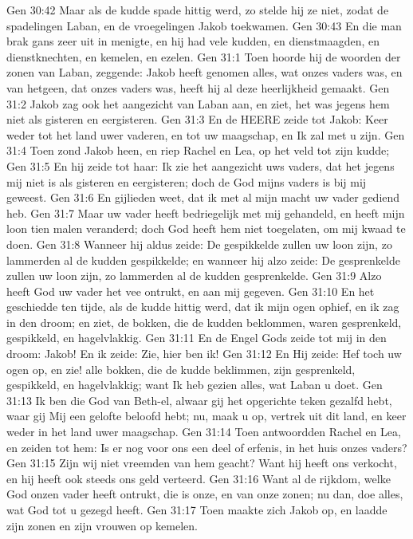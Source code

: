 Gen 30:42  Maar als de kudde spade hittig werd, zo stelde hij ze niet, zodat de spadelingen Laban, en de vroegelingen Jakob toekwamen.
Gen 30:43  En die man brak gans zeer uit in menigte, en hij had vele kudden, en dienstmaagden, en dienstknechten, en kemelen, en ezelen.
Gen 31:1  Toen hoorde hij de woorden der zonen van Laban, zeggende: Jakob heeft genomen alles, wat onzes vaders was, en van hetgeen, dat onzes vaders was, heeft hij al deze heerlijkheid gemaakt.
Gen 31:2  Jakob zag ook het aangezicht van Laban aan, en ziet, het was jegens hem niet als gisteren en eergisteren.
Gen 31:3  En de HEERE zeide tot Jakob: Keer weder tot het land uwer vaderen, en tot uw maagschap, en Ik zal met u zijn.
Gen 31:4  Toen zond Jakob heen, en riep Rachel en Lea, op het veld tot zijn kudde;
Gen 31:5  En hij zeide tot haar: Ik zie het aangezicht uws vaders, dat het jegens mij niet is als gisteren en eergisteren; doch de God mijns vaders is bij mij geweest.
Gen 31:6  En gijlieden weet, dat ik met al mijn macht uw vader gediend heb.
Gen 31:7  Maar uw vader heeft bedriegelijk met mij gehandeld, en heeft mijn loon tien malen veranderd; doch God heeft hem niet toegelaten, om mij kwaad te doen.
Gen 31:8  Wanneer hij aldus zeide: De gespikkelde zullen uw loon zijn, zo lammerden al de kudden gespikkelde; en wanneer hij alzo zeide: De gesprenkelde zullen uw loon zijn, zo lammerden al de kudden gesprenkelde.
Gen 31:9  Alzo heeft God uw vader het vee ontrukt, en aan mij gegeven.
Gen 31:10  En het geschiedde ten tijde, als de kudde hittig werd, dat ik mijn ogen ophief, en ik zag in den droom; en ziet, de bokken, die de kudden beklommen, waren gesprenkeld, gespikkeld, en hagelvlakkig.
Gen 31:11  En de Engel Gods zeide tot mij in den droom: Jakob! En ik zeide: Zie, hier ben ik!
Gen 31:12  En Hij zeide: Hef toch uw ogen op, en zie! alle bokken, die de kudde beklimmen, zijn gesprenkeld, gespikkeld, en hagelvlakkig; want Ik heb gezien alles, wat Laban u doet.
Gen 31:13  Ik ben die God van Beth-el, alwaar gij het opgerichte teken gezalfd hebt, waar gij Mij een gelofte beloofd hebt; nu, maak u op, vertrek uit dit land, en keer weder in het land uwer maagschap.
Gen 31:14  Toen antwoordden Rachel en Lea, en zeiden tot hem: Is er nog voor ons een deel of erfenis, in het huis onzes vaders?
Gen 31:15  Zijn wij niet vreemden van hem geacht? Want hij heeft ons verkocht, en hij heeft ook steeds ons geld verteerd.
Gen 31:16  Want al de rijkdom, welke God onzen vader heeft ontrukt, die is onze, en van onze zonen; nu dan, doe alles, wat God tot u gezegd heeft.
Gen 31:17  Toen maakte zich Jakob op, en laadde zijn zonen en zijn vrouwen op kemelen.
